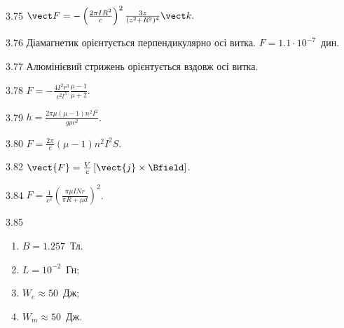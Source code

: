 \begin{Solution}{3.{75}}
	$\vect F = - \left( \frac{2\pi IR^2}{c}\right)^2 \frac{3z}{(z^2 + R^2)^4} \vect k.$
\end{Solution}
\begin{Solution}{3.{76}}
	Діамагнетик орієнтується перпендикулярно осі витка. $F = 1.1\cdot 10^{-7}$~дин.
\end{Solution}
\begin{Solution}{3.{77}}
	Алюмінієвий стрижень орієнтується вздовж осі витка.
\end{Solution}
\begin{Solution}{3.{78}}
	$F = - \frac{4I^2r^3}{c^2l^3}\frac{\mu - 1}{\mu + 2}$.
\end{Solution}
\begin{Solution}{3.{79}}
	$h = \frac{2\pi\mu(\mu - 1)n^2 I^2}{g\rho c^2}$.
\end{Solution}
\begin{Solution}{3.{80}}
	$F = \frac{2\pi}{c} (\mu - 1) n^2 I^2S$.
\end{Solution}
\begin{Solution}{3.{82}}
	$\vect{F} = \frac{V}{c} \left[ \vect{j}\times\Bfield\right] $.
\end{Solution}
\begin{Solution}{3.{84}}
	$F = \frac1{c^2}\left( \frac{\pi\mu I N r}{\pi R + \mu d}\right)^2$.
\end{Solution}
\begin{Solution}{3.{85}}
\begin{enumerate}[label=\alph*)]
	\item $B = 1.257$~Тл.
	\item $L = 10^{-2}$~Гн;
	\item $W_e \approx 50$~Дж;
	\item  $W_m \approx 50$~Дж.
\end{enumerate}
\end{Solution}
